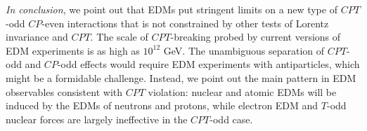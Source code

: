 \documentclass[prl,twocolumn,tightenlines,preprintnumbers,floatfix,nofootinbib]{revtex4}
\begin{document}

{\em In conclusion}, we point out that EDMs put stringent limits on a new type of 
$CPT$-odd $CP$-even interactions that is not constrained by other tests
of Lorentz invariance and $CPT$. The scale of $CPT$-breaking probed by 
current versions of EDM experiments is as high as $10^{12}$ GeV. 
The unambiguous separation of $CPT$-odd and $CP$-odd 
effects would require EDM experiments with antiparticles, which might be a formidable 
challenge. Instead, we point out the main pattern in EDM observables consistent with $CPT$
violation: nuclear and atomic EDMs will be induced by the EDMs of neutrons and protons, 
while electron EDM and $T$-odd nuclear forces are largely ineffective in the $CPT$-odd case.
\end{document}
